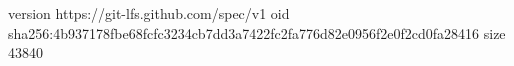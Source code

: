 version https://git-lfs.github.com/spec/v1
oid sha256:4b937178fbe68fcfc3234cb7dd3a7422fc2fa776d82e0956f2e0f2cd0fa28416
size 43840
